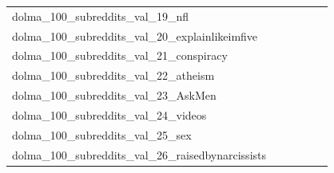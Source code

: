 \documentclass[dvipsnames]{article}
\begin{document}
\begin{appendix}
{\begin{longtable}{m{6cm}m{1.7cm}m{1.7cm}m{1.7cm}m{1.7cm}m{1.7cm}}
	dolma\_100\_subreddits\_val\_19\_nfl  & \colorbox[HTML]{ffffe5}{\makebox[\mywidth][c]{19.86}} & \colorbox[HTML]{c1e597}{\makebox[\mywidth][c]{18.76}} & \colorbox[HTML]{ffffe5}{\makebox[\mywidth][c]{20.17}} & \colorbox[HTML]{d5eea1}{\makebox[\mywidth][c]{18.81}} & \colorbox[HTML]{77c578}{\makebox[\mywidth][c]{18.62}}\\
	dolma\_100\_subreddits\_val\_20\_explainlikeimfive  & \colorbox[HTML]{ffffe5}{\makebox[\mywidth][c]{18.35}} & \colorbox[HTML]{d1ec9f}{\makebox[\mywidth][c]{17.21}} & \colorbox[HTML]{ffffe5}{\makebox[\mywidth][c]{18.59}} & \colorbox[HTML]{eaf7af}{\makebox[\mywidth][c]{17.32}} & \colorbox[HTML]{77c578}{\makebox[\mywidth][c]{17.03}}\\
	dolma\_100\_subreddits\_val\_21\_conspiracy  & \colorbox[HTML]{ffffe5}{\makebox[\mywidth][c]{23.86}} & \colorbox[HTML]{77c578}{\makebox[\mywidth][c]{22.53}} & \colorbox[HTML]{ffffe5}{\makebox[\mywidth][c]{24.09}} & \colorbox[HTML]{c5e799}{\makebox[\mywidth][c]{22.67}} & \colorbox[HTML]{7cc77a}{\makebox[\mywidth][c]{22.54}}\\
	dolma\_100\_subreddits\_val\_22\_atheism  & \colorbox[HTML]{ffffe5}{\makebox[\mywidth][c]{21.23}} & \colorbox[HTML]{9fd688}{\makebox[\mywidth][c]{20.18}} & \colorbox[HTML]{ffffe5}{\makebox[\mywidth][c]{21.43}} & \colorbox[HTML]{bbe395}{\makebox[\mywidth][c]{20.23}} & \colorbox[HTML]{77c578}{\makebox[\mywidth][c]{20.13}}\\
	dolma\_100\_subreddits\_val\_23\_AskMen  & \colorbox[HTML]{ffffe5}{\makebox[\mywidth][c]{20.00}} & \colorbox[HTML]{c1e597}{\makebox[\mywidth][c]{19.04}} & \colorbox[HTML]{ffffe5}{\makebox[\mywidth][c]{20.11}} & \colorbox[HTML]{dbf1a4}{\makebox[\mywidth][c]{19.10}} & \colorbox[HTML]{77c578}{\makebox[\mywidth][c]{18.94}}\\
	dolma\_100\_subreddits\_val\_24\_videos  & \colorbox[HTML]{ffffe5}{\makebox[\mywidth][c]{22.26}} & \colorbox[HTML]{daf0a4}{\makebox[\mywidth][c]{21.24}} & \colorbox[HTML]{ffffe5}{\makebox[\mywidth][c]{22.51}} & \colorbox[HTML]{e5f5ac}{\makebox[\mywidth][c]{21.29}} & \colorbox[HTML]{77c578}{\makebox[\mywidth][c]{21.04}}\\
	dolma\_100\_subreddits\_val\_25\_sex  & \colorbox[HTML]{ffffe5}{\makebox[\mywidth][c]{21.13}} & \colorbox[HTML]{d3eda0}{\makebox[\mywidth][c]{20.13}} & \colorbox[HTML]{ffffe5}{\makebox[\mywidth][c]{21.30}} & \colorbox[HTML]{c1e597}{\makebox[\mywidth][c]{20.09}} & \colorbox[HTML]{77c578}{\makebox[\mywidth][c]{19.98}}\\
	dolma\_100\_subreddits\_val\_26\_raisedbynarcissists  & \colorbox[HTML]{ffffe5}{\makebox[\mywidth][c]{22.07}} & \colorbox[HTML]{a0d789}{\makebox[\mywidth][c]{21.08}} & \colorbox[HTML]{ffffe5}{\makebox[\mywidth][c]{22.48}} & \colorbox[HTML]{d5eea1}{\makebox[\mywidth][c]{21.20}} & \colorbox[HTML]{77c578}{\makebox[\mywidth][c]{21.02}}\\

\end{longtable}}
\end{appendix}
\end{document}
